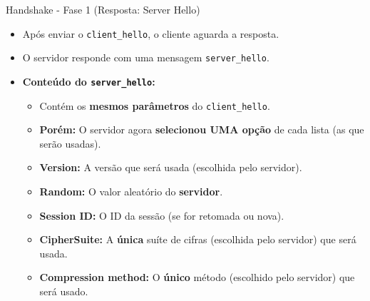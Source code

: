 \begin{frame}{Handshake - Fase 1 (Resposta: Server Hello)}
    \begin{itemize}
        \item Após enviar o \texttt{client\_hello}, o cliente aguarda a resposta.

        \item O servidor responde com uma mensagem \texttt{server\_hello}.

        \item \textbf{Conteúdo do \texttt{server\_hello}:}
              \begin{itemize}
                  \item Contém os \textbf{mesmos parâmetros} do \texttt{client\_hello}.
                  \item \textbf{Porém:} O servidor agora \textbf{selecionou UMA opção} de cada lista (as que serão usadas).
                  \item \textbf{Version:} A versão que será usada (escolhida pelo servidor).
                  \item \textbf{Random:} O valor aleatório do \textbf{servidor}.
                  \item \textbf{Session ID:} O ID da sessão (se for retomada ou nova).
                  \item \textbf{CipherSuite:} A \textbf{única} suíte de cifras (escolhida pelo servidor) que será usada.
                  \item \textbf{Compression method:} O \textbf{único} método (escolhido pelo servidor) que será usado.
              \end{itemize}
    \end{itemize}
\end{frame}

